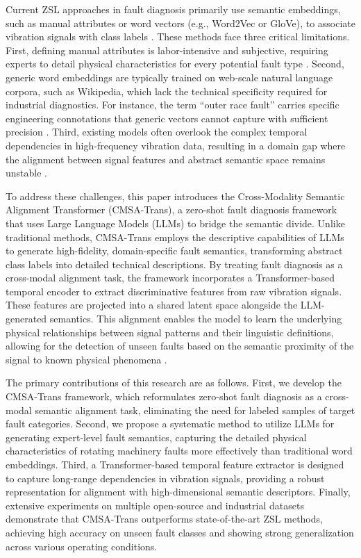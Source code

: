 \documentclass[journal]{IEEEtran}
\begin{document}
Current ZSL approaches in fault diagnosis primarily use semantic embeddings, such as manual attributes or word vectors (e.g., Word2Vec or GloVe), to associate vibration signals with class labels \cite{lampert2014attribute}. These methods face three critical limitations. First, defining manual attributes is labor-intensive and subjective, requiring experts to detail physical characteristics for every potential fault type \cite{fu2018zero}. Second, generic word embeddings are typically trained on web-scale natural language corpora, such as Wikipedia, which lack the technical specificity required for industrial diagnostics. For instance, the term ``outer race fault'' carries specific engineering connotations that generic vectors cannot capture with sufficient precision \cite{mikolov2013efficient}. Third, existing models often overlook the complex temporal dependencies in high-frequency vibration data, resulting in a domain gap where the alignment between signal features and abstract semantic space remains unstable \cite{xian2018zero, buchert2020zero}.

To address these challenges, this paper introduces the Cross-Modality Semantic Alignment Transformer (CMSA-Trans), a zero-shot fault diagnosis framework that uses Large Language Models (LLMs) to bridge the semantic divide. Unlike traditional methods, CMSA-Trans employs the descriptive capabilities of LLMs to generate high-fidelity, domain-specific fault semantics, transforming abstract class labels into detailed technical descriptions. By treating fault diagnosis as a cross-modal alignment task, the framework incorporates a Transformer-based temporal encoder to extract discriminative features from raw vibration signals. These features are projected into a shared latent space alongside the LLM-generated semantics. This alignment enables the model to learn the underlying physical relationships between signal patterns and their linguistic definitions, allowing for the detection of unseen faults based on the semantic proximity of the signal to known physical phenomena \cite{vaswani2017attention, radford2021learning}.

The primary contributions of this research are as follows. First, we develop the CMSA-Trans framework, which reformulates zero-shot fault diagnosis as a cross-modal semantic alignment task, eliminating the need for labeled samples of target fault categories. Second, we propose a systematic method to utilize LLMs for generating expert-level fault semantics, capturing the detailed physical characteristics of rotating machinery faults more effectively than traditional word embeddings. Third, a Transformer-based temporal feature extractor is designed to capture long-range dependencies in vibration signals, providing a robust representation for alignment with high-dimensional semantic descriptors. Finally, extensive experiments on multiple open-source and industrial datasets demonstrate that CMSA-Trans outperforms state-of-the-art ZSL methods, achieving high accuracy on unseen fault classes and showing strong generalization across various operating conditions.
\end{document}
